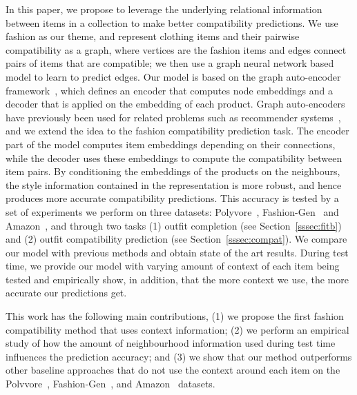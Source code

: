 \documentclass[10pt,twocolumn,letterpaper]{article}
\begin{document}
In this paper, we propose to leverage the underlying relational information between items in a collection to make better compatibility predictions. We use fashion as our theme, and 
represent clothing items and their pairwise compatibility as a graph, where vertices are the fashion items and edges connect pairs of items that are compatible; we then use a graph neural network based model to learn to predict edges. Our model is based on the graph auto-encoder framework~\cite{kipf2016variational}, which defines an encoder that computes node embeddings and a decoder that is applied on the embedding of each product. Graph auto-encoders have previously been used for related problems such as recommender systems~\cite{vdberg2017graph}, and we extend the idea to the fashion compatibility prediction task. The encoder part of the model computes item embeddings depending on their connections, while the decoder uses these embeddings to compute the compatibility between item pairs. By conditioning the embeddings of the products on the neighbours, the style information contained in the representation is more robust, and hence produces more accurate compatibility predictions. 
This accuracy is tested by a set of experiments we perform on three datasets: Polyvore~\cite{han2017learning}, Fashion-Gen~\cite{rostamzadeh2018fashion} and Amazon~\cite{mcauley2015image}, and through two tasks (1) outfit completion (see Section~\ref{sssec:fitb}) and (2) outfit compatibility prediction (see Section~\ref{sssec:compat}). 
We compare our model with previous methods and obtain state of the art results. 
During test time, we provide our model with varying amount of context of each item being tested
and empirically show, in addition, that the more context we use, the more accurate our predictions get. 





This work has the following main contributions, (1) we propose the first fashion compatibility method that uses context information; (2) we perform an empirical study of how the amount of neighbourhood information used during test time influences the prediction accuracy; and (3) we show that our method outperforms other baseline approaches that do not use the context around each item on the Polvvore~\cite{han2017learning}, Fashion-Gen~\cite{rostamzadeh2018fashion}, and Amazon~\cite{mcauley2015image} datasets.





\iffalse
\end{document}
